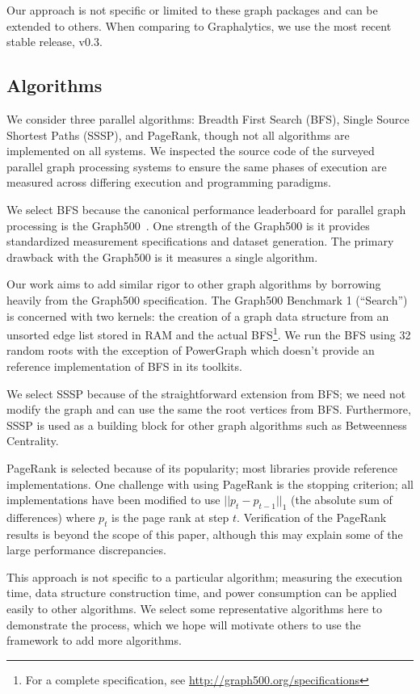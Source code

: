 \documentclass[conference]{IEEEtran}
\begin{document}
Our approach is not specific or limited to these graph packages and can be extended to others. When comparing to Graphalytics, we use the most recent stable release, v0.3.

\subsection{Algorithms}\label{sec:algs}

We consider three parallel algorithms: Breadth First Search (BFS), Single Source Shortest Paths (SSSP), and PageRank, though not all algorithms are implemented on all systems. We inspected the source code of the surveyed parallel graph processing systems to ensure the same phases of execution are measured across differing execution and programming paradigms. 

We select BFS because the canonical performance leaderboard for parallel graph processing is the Graph500~\cite{Murphy:2010:Graph500}. One strength of the Graph500 is it provides standardized measurement specifications and dataset generation. The primary drawback with the Graph500 is it measures a single algorithm.

Our work aims to add similar rigor to other graph algorithms by borrowing heavily from the Graph500 specification. The Graph500 Benchmark 1 (``Search'') is concerned with two kernels: the creation of a graph data structure from an unsorted edge list stored in RAM and the actual BFS\footnote{For a complete specification, see \url{http://graph500.org/specifications}}. We run the BFS using 32 random roots with the exception of PowerGraph which doesn't provide an reference implementation of BFS in its toolkits.

We select SSSP because of the straightforward extension from BFS; we need not modify the graph and can use the same the root vertices from BFS. Furthermore, SSSP is used as a building block for other graph algorithms such as Betweenness Centrality.

PageRank is selected because of its popularity; most libraries provide reference implementations. One challenge with using PageRank is the stopping criterion; all implementations have been modified to use $|| p_t - p_{t-1}||_1$ (the absolute sum of differences) where $p_t$ is the page rank at step $t$. Verification of the PageRank results is beyond the scope of this paper, although this may explain some of the large performance discrepancies.

This approach is not specific to a particular algorithm; measuring the execution time, data structure construction time, and power consumption can be applied easily to other algorithms. We select some representative algorithms here to demonstrate the process, which we hope will motivate others to use
the framework to add more algorithms.
\end{document}
